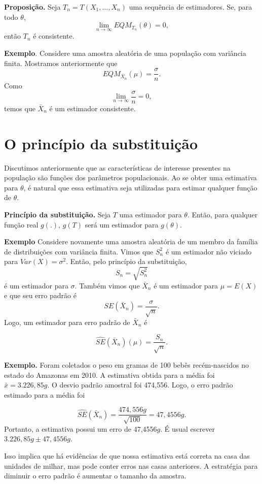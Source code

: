 \documentclass[
  letterpaper,
  DIV=11,
  numbers=noendperiod]{scrartcl}
\begin{document}
\textbf{Proposição.} Seja \(T_n=T(X_1,\ldots,X_n)\) uma sequência de
estimadores. Se, para todo \(\theta\),
\[\lim_{n\rightarrow\infty}EQM_{T_n}(\theta)=0,\] então \(T_n\) é
consistente.

\textbf{Exemplo}. Considere uma amostra aleatória de uma população com
variância finita. Mostramos anteriormente que
\[EQM_{\bar{X}_n}(\mu)=\frac{\sigma}{n}.\] Como
\[\lim_{n\rightarrow\infty}\frac{\sigma}{n}=0,\] temos que \(\bar{X}_n\)
é um estimador consistente.

\section{O princípio da
substituição}\label{o-princuxedpio-da-substituiuxe7uxe3o}

Discutimos anteriormente que as características de interesse presentes
na população são funções dos parâmetros populacionais. Ao se obter uma
estimativa para \(\theta\), é natural que essa estimativa seja
utilizadas para estimar qualquer função de \(\theta\).

\textbf{Princípio da substituição.} Seja \(T\) uma estimador para
\(\theta\). Então, para qualquer função real \(g(.)\), \(g(T)\) será um
estimador para \(g(\theta)\).

\textbf{Exemplo} Considere novamente uma amostra aleatória de um membro
da família de distribuições com variância finita. Vimos que \(S^2_n\) é
um estimador não viciado para \(Var(X)=\sigma^2\). Então, pelo princípio
da substituição, \[S_n=\sqrt{S^2_n}\] é um estimador para \(\sigma\).
Também vimos que \(\bar{X}_n\) é um estimador para \(\mu=E(X)\) e que
seu erro padrão é \[SE(\bar{X}_n)=\frac{\sigma}{\sqrt{n}}.\] Logo, um
estimador para erro padrão de \(\bar{X}_n\) é

\[\widehat{SE}(\bar{X}_n)(\mu)=\frac{S_n}{\sqrt{n}}.\]

\textbf{Exemplo.} Foram coletados o peso em gramas de 100 bebês
recém-nascidos no estado do Amazonas em 2010. A estimativa obtida para a
média foi \(\bar{x}=3.226,85 g\). O desvio padrão amostral foi 474,556.
Logo, o erro padrão estimado para a média foi

\[\hat{SE}(\bar{X}_n)=\frac{474,556g}{\sqrt{100}}=47,4556g.\] Portanto,
a estimativa possui um erro de 47,4556\(g\). É usual escrever
\(3.226,85g\pm47,4556g\).

Isso implica que há evidências de que nossa estimativa está correta na
casa das unidades de milhar, mas pode conter erros nas casas anteriores.
A estratégia para diminuir o erro padrão é aumentar o tamanho da
amostra.
\end{document}
